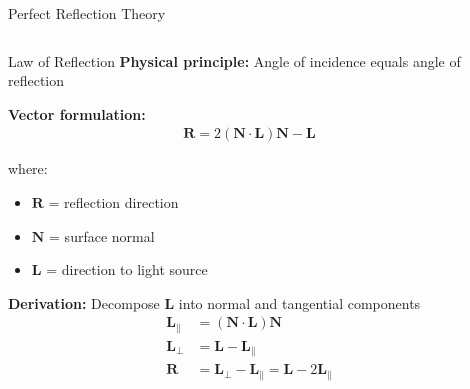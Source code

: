 \begin{frame}{Perfect Reflection Theory}
  \begin{columns}
    \begin{column}{0.6\textwidth}
      \begin{mathbox}{Law of Reflection}
        \textbf{Physical principle:} Angle of incidence equals angle of reflection

        \vspace{0.3cm}
        \textbf{Vector formulation:}
        \begin{align}
          \mathbf{R} = 2(\mathbf{N} \cdot \mathbf{L})\mathbf{N} - \mathbf{L}
        \end{align}

        where:
        \begin{itemize}
          \item $\mathbf{R}$ = reflection direction
          \item $\mathbf{N}$ = surface normal
          \item $\mathbf{L}$ = direction to light source
        \end{itemize}

        \vspace{0.3cm}
        \pause
        \textbf{Derivation:} Decompose $\mathbf{L}$ into normal and tangential components
        \begin{align}
          \mathbf{L}_{\parallel} &= (\mathbf{N} \cdot \mathbf{L})\mathbf{N} \\
          \mathbf{L}_{\perp} &= \mathbf{L} - \mathbf{L}_{\parallel} \\
          \mathbf{R} &= \mathbf{L}_{\perp} - \mathbf{L}_{\parallel} = \mathbf{L} - 2\mathbf{L}_{\parallel}
        \end{align}
      \end{mathbox}
    \end{column}
    \begin{column}{0.4\textwidth}
\end{column}
\end{columns}
\end{frame}
